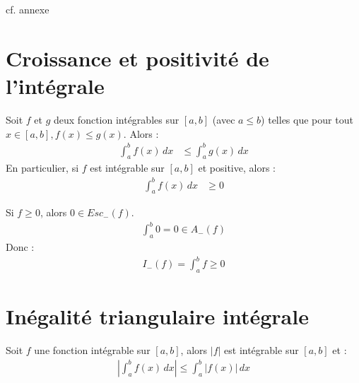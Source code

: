 \documentclass[../main.tex]{subfiles}
\begin{document}
\noindent cf. annexe

\section{Croissance et positivité de l'intégrale}
\begin{tcolorbox}[title=Propostion 20.49, title filled=false, colframe=lightblue, colback=lightblue!10!white]
    Soit $f$ et $g$ deux fonction intégrables sur $[a, b]$ (avec $a \leq b$) telles que pour tout $x\in [a, b], f(x) \leq g(x)$. Alors : 
    \begin{align*}
        \int_{a}^{b} f(x) \,dx &\leq \int_{a}^{b} g(x) \,dx
    \end{align*}
    En particulier, si $f$ est intégrable sur $[a, b]$ et positive, alors :
    \begin{align*}
        \int_{a}^{b} f(x) \,dx &\geq 0
    \end{align*}
\end{tcolorbox}

\noindent Si $f\geq 0$, alors $0\in Esc_-(f)$. \\
\begin{align*}
    \int_{a}^{b} 0 = 0 \in A_-(f)
\end{align*}
Donc :
\begin{align*}
    I_-(f) = \int_{a}^{b} f \geq 0
\end{align*}

\section{Inégalité triangulaire intégrale}
\begin{tcolorbox}[title=Propostion 26.51, title filled=false, colframe=lightblue, colback=lightblue!10!white]
    Soit $f$ une fonction intégrable sur $[a, b]$, alors $|f|$ est intégrable sur $[a, b]$ et : 
    \begin{align*}
        \left| \int_{a}^{b} f(x) \,dx \right| \leq \int_{a}^{b} |f(x)| \,dx
    \end{align*}
\end{tcolorbox}
\end{document}

